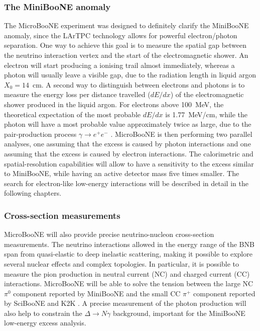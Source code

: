\subsubsection{The MiniBooNE anomaly}
The MicroBooNE experiment was designed to definitely clarify the MiniBooNE anomaly, since the LArTPC technology allows for powerful electron/photon separation. One way to achieve this goal is to measure the spatial gap between the neutrino interaction vertex and the start of the electromagnetic shower. An electron will start producing a ionising trail almost immediately, whereas a photon will usually leave a visible gap, due to the radiation length in liquid argon $X_0 = 14$~cm.
A second way to distinguish between electrons and photons is to measure the energy loss per distance travelled ($dE/dx$) of the electromagnetic shower produced in the liquid argon. For electrons above 100~MeV, the theoretical expectation of the most probable $dE/dx$ is 1.77~MeV/cm, while the photon will have a most probable value approximately twice as large, due to the pair-production process $\gamma\rightarrow e^+e^-$ \cite{Acciarri:2016sli}. 
MicroBooNE is then performing two parallel analyses, one assuming that the excess is caused by photon interactions and one assuming that the excess is caused by electron interactions. The calorimetric and spatial-resolution capabilities will allow to have a sensitivity to the excess similar to MiniBooNE, while having an active detector mass five times smaller.  The search for electron-like low-energy interactions will be described in detail in the following chapters.

\subsubsection{Cross-section measurements}
MicroBooNE will also provide precise neutrino-nucleon cross-section measurements. The neutrino interactions allowed in the energy range of the BNB span from quasi-elastic to deep inelastic scattering, making it possible to explore several nuclear effects and complex topologies.
In particular, it is possible to measure the pion production in neutral current (NC) and charged current (CC) interactions. MicroBooNE will be able to solve the tension between the large NC $\pi^0$ component reported by MiniBooNE and the small CC $\pi^+$ component reported by SciBooNE \cite{Hiraide:2008eu} and K2K \cite{Tanaka:2006zm}. A precise measurement of the photon production will also help to constrain the $\Delta\rightarrow N\gamma$ background, important for the MiniBooNE low-energy excess analysis. 

